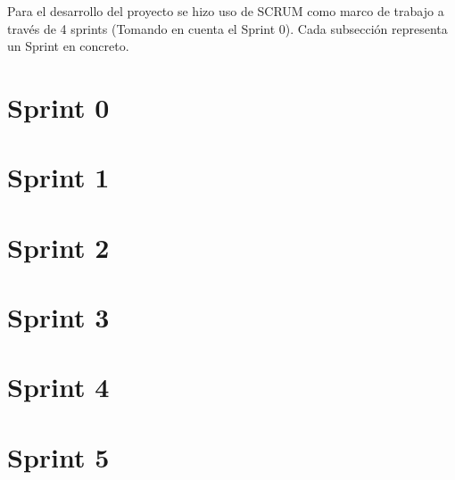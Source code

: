 

Para el desarrollo del proyecto se hizo uso de SCRUM \cite{SCRUM} como marco de trabajo a través de 4 sprints \cite{SCRUM-Sprints} (Tomando en cuenta el Sprint 0). Cada subsección representa un Sprint en concreto. 

\section{Sprint 0}\label{chapter02-section02-sprint0}


\section{Sprint 1}
\label{chapter02-section02-sprint1}


\section{Sprint 2}\label{chapter02-section02-sprint2}



\section{Sprint 3}\label{chapter02-section02-sprint3}



\section{Sprint 4}\label{chapter02-section02-sprint4}


\section{Sprint 5}\label{chapter02-section02-sprint5}
